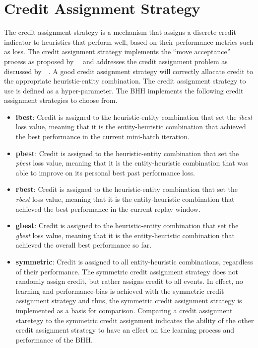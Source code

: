 \section{Credit Assignment Strategy}
\label{sec:bhh:credit_assignment_strategy}

The credit assignment strategy is a mechanism that assigns a discrete credit indicator to heuristics that perform well, based on their performance metrics such as loss. The credit assignment strategy implements the ``move acceptance'' process as proposed by~\citeauthor{ref:ozcan:2006}~\cite{ref:ozcan:2006,ref:ozcan:2008} and addresses the credit assignment problem as discussed by~\citeauthor{ref:burke:2010}~\cite{ref:burke:2010}. A good credit assignment strategy will correctly allocate credit to the appropriate heuristic-entity combination. The credit assignment strategy to use is defined as a hyper-parameter. The \acs{BHH} implements the following credit assignment strategies to choose from.

\begin{itemize}
      \item \textbf{ibest}: Credit is assigned to the heuristic-entity combination that set the \textit{ibest} loss value, meaning that it is the entity-heuristic combination that achieved the best performance in the current mini-batch iteration.

      \item \textbf{pbest}: Credit is assigned to the heuristic-entity combination that set the \textit{pbest} loss value, meaning that it is the entity-heuristic combination that was able to improve on its personal best past performance loss.

      \item \textbf{rbest}: Credit is assigned to the heuristic-entity combination that set the \textit{rbest} loss value, meaning that it is the entity-heuristic combination that achieved the best performance in the current replay window.

      \item \textbf{gbest}: Credit is assigned to the heuristic-entity combination that set the \textit{gbest} loss value, meaning that it is the entity-heuristic combination that achieved the overall best performance so far.

      \item \textbf{symmetric}: Credit is assigned to all entity-heuristic combinations, regardless of their performance. The symmetric credit assignment strategy does not randomly assign credit, but rather assigns credit to all events. In effect, no learning and performance-bias is achieved with the symmetric credit assignment strategy and thus, the symmetric credit assignment strategy is implemented as a basis for comparison. Comparing a credit assignment staretegy to the symmetric credit assignment indicates the ability of the other credit assignment strategy to have an effect on the learning process and performance of the \acs{BHH}.
\end{itemize}

